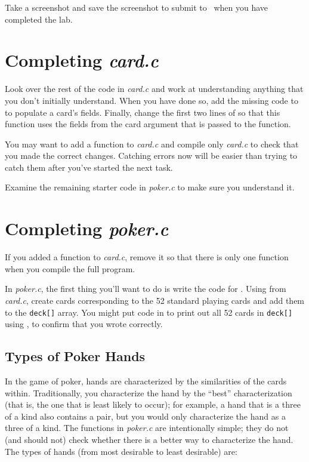 Take a screenshot and save the screenshot to submit to \filesubmission\ when you
have completed the lab.

\section{Completing \textit{card.c}}

Look over the rest of the code in \textit{card.c} and work at understanding
anything that you don't initially understand. When you have done so, add the
missing code to  to populate a card's fields.
Finally, change the first two lines of  so
that this function uses the fields from the card argument that is passed to the
function.

You may want to add a  function to \textit{card.c} and compile
only \textit{card.c} to check that you made the correct changes. Catching
errors now will be easier than trying to catch them after you've started the
next task.

Examine the remaining starter code in \textit{poker.c} to make sure you
understand it.

\section{Completing \textit{poker.c}}

If you added a  function to \textit{card.c}, remove it so that
there is only one  function when you compile the full program.

In \textit{poker.c}, the first thing you'll want to do is write the code for
. Using  from \textit{card.c},
create cards corresponding to the 52 standard playing cards and add them to the
\lstinline{deck[]} array. You might put code in  to print out
all 52 cards in \lstinline{deck[]} using , to confirm
that you wrote  correctly.

\subsection{Types of Poker Hands}
\label{TypesOfPokerHands}

In the game of poker, hands are characterized by the similarities of the cards
within. Traditionally, you characterize the hand by the ``best''
characterization (that is, the one that is least likely to occur); for example,
a hand that is a three of a kind also contains a pair, but you would only
characterize the hand as a three of a kind. The  functions in
\textit{poker.c} are intentionally simple; they do not (and should not) check
whether there is a better way to characterize the hand. The types of hands
(from most desirable to least desirable) are:

